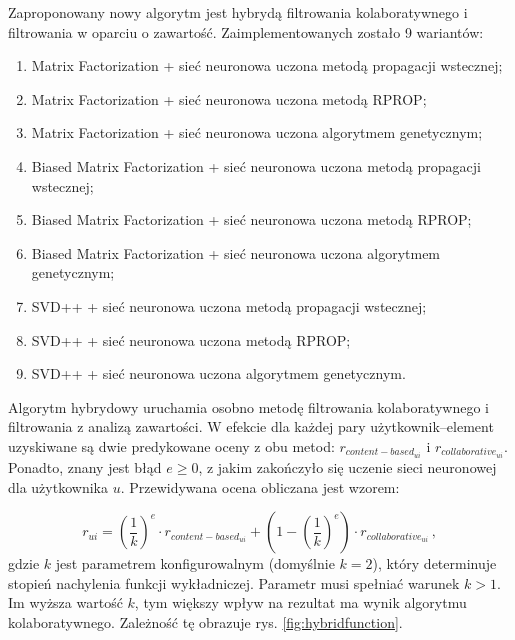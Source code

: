 \documentclass[twoside]{iisthesis}
\begin{document}
		 Zaproponowany nowy algorytm jest hybrydą filtrowania kolaboratywnego i filtrowania w oparciu o zawartość. Zaimplementowanych zostało 9 wariantów:
		 
		 \begin{enumerate}
		 	\item Matrix Factorization + sieć neuronowa uczona metodą propagacji wstecznej;
		 	\item Matrix Factorization + sieć neuronowa uczona metodą RPROP;
		 	\item Matrix Factorization + sieć neuronowa uczona algorytmem genetycznym;
		 	\item Biased Matrix Factorization + sieć neuronowa uczona metodą propagacji wstecznej;
		 	\item Biased Matrix Factorization + sieć neuronowa uczona metodą RPROP;
		 	\item Biased Matrix Factorization + sieć neuronowa uczona algorytmem genetycznym;		 	
		 	\item SVD++ + sieć neuronowa uczona metodą propagacji wstecznej;
		 	\item SVD++ + sieć neuronowa uczona metodą RPROP;
		 	\item SVD++ + sieć neuronowa uczona algorytmem genetycznym.
		 \end{enumerate}
		 
		 
		 Algorytm hybrydowy uruchamia osobno metodę filtrowania kolaboratywnego i filtrowania z analizą zawartości. W efekcie dla każdej pary użytkownik--element uzyskiwane są dwie  predykowane oceny z obu metod:  $r_{content-based_{ui}}$ i $r_{collaborative_{ui}}$. Ponadto, znany jest błąd $e \geq 0$, z jakim zakończyło się uczenie sieci neuronowej dla użytkownika $u$. Przewidywana ocena obliczana jest wzorem:
		 
		 \begin{equation}
		 	\label{eq:hybrid}		 	
		 	 r_{ui} = (\frac{1}{k})^e \cdot r_{content-based_{ui}} + (1-(\frac{1}{k})^e) \cdot r_{collaborative_{ui}}
		 	\,,
		 \end{equation}		 
		 gdzie $k$ jest parametrem konfigurowalnym (domyślnie $k = 2$), który determinuje stopień nachylenia funkcji wykładniczej. Parametr musi spełniać warunek $k>1$. Im wyższa wartość $k$, tym większy wpływ na rezultat ma wynik algorytmu kolaboratywnego. Zależność tę obrazuje rys. \ref{fig:hybridfunction}.
		 
\end{document}
